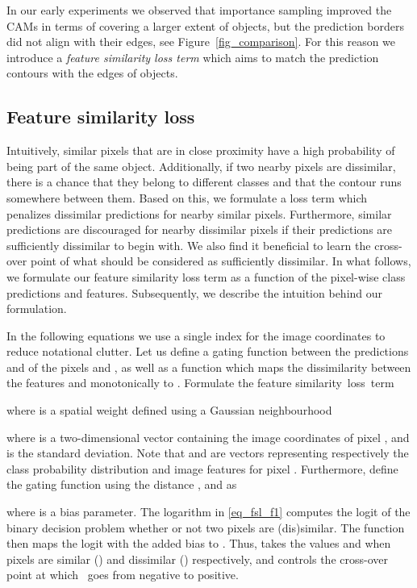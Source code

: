 \documentclass{article}
\begin{document}
In our early experiments we observed that importance sampling improved the CAMs in terms of covering a larger extent of objects, but the prediction borders did not align with their edges, see Figure~\ref{fig_comparison}. For this reason we introduce a \textit{feature similarity loss term} which aims to match the prediction contours with the edges of objects.

\subsection{Feature similarity loss}
\label{sec_feature_similarity_loss}

Intuitively, similar pixels that are in close proximity have a high probability of being part of the same object. Additionally, if two nearby pixels are dissimilar, there is a chance that they belong to different classes and that the contour runs somewhere between them. Based on this, we formulate a loss term which penalizes dissimilar predictions for nearby similar pixels. Furthermore, similar predictions are discouraged for nearby dissimilar pixels if their predictions are sufficiently dissimilar to begin with. We also find it beneficial to learn the cross-over point of what should be considered as sufficiently dissimilar. In what follows, we formulate our feature similarity loss term as a function of the pixel-wise class predictions and features. Subsequently, we describe the intuition behind our formulation.

In the following equations we use a single index for the image coordinates to reduce notational clutter. Let us define a gating function  between the predictions  and  of the pixels  and , as well as a function  which maps the dissimilarity  between the features  and  monotonically to . Formulate the feature similarity~loss~term

where  is a spatial weight defined using a Gaussian neighbourhood

where  is a two-dimensional vector containing the image coordinates of pixel , and  is the standard deviation. Note that  and  are vectors representing respectively the class probability distribution and image features for pixel . Furthermore, define the gating function using the  distance , and  as

where  is a bias parameter. The logarithm in \eqref{eq_fsl_f1} computes the logit of the binary decision problem whether or not two pixels are (dis)similar. The  function then maps the logit with the added bias to . Thus,  takes the values  and  when pixels are similar () and dissimilar () respectively, and  controls the cross-over point at which~ goes from negative to positive.
\end{document}
